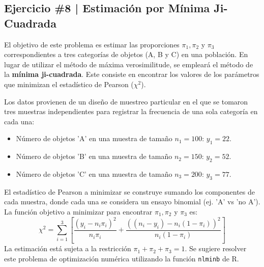 \newpage

\begin{myblock}
\section*{Ejercicio \#8 | Estimación por Mínima Ji-Cuadrada}

El objetivo de este problema es estimar las proporciones $\pi_1, \pi_2$ y $\pi_3$ correspondientes a tres categorías de objetos (A, B y C) en una población. En lugar de utilizar el método de máxima verosimilitude, se empleará el método de la \textbf{mínima ji-cuadrada}. Este consiste en encontrar los valores de los parámetros que minimizan el estadístico de Pearson ($\chi^2$).

Los datos provienen de un diseño de muestreo particular en el que se tomaron tres muestras independientes para registrar la frecuencia de una sola categoría en cada una:
\begin{itemize}
    \item Número de objetos 'A' en una muestra de tamaño $n_1=100$: $y_1=22$.
    \item Número de objetos 'B' en una muestra de tamaño $n_2=150$: $y_2=52$.
    \item Número de objetos 'C' en una muestra de tamaño $n_3=200$: $y_3=77$.
\end{itemize}

El estadístico de Pearson a minimizar se construye sumando los componentes de cada muestra, donde cada una se considera un ensayo binomial (ej. 'A' vs 'no A'). La función objetivo a minimizar para encontrar $\pi_1, \pi_2$ y $\pi_3$ es:
\[
    \chi^2 = \sum_{i=1}^{3} \left[ \frac{(y_i - n_i\pi_i)^2}{n_i\pi_i} + \frac{((n_i-y_i) - n_i(1-\pi_i))^2}{n_i(1-\pi_i)} \right]
\]
La estimación está sujeta a la restricción $ \pi_1 + \pi_2 + \pi_3 = 1 $. Se sugiere resolver este problema de optimización numérica utilizando la función \texttt{nlminb} de R.

\end{myblock}



